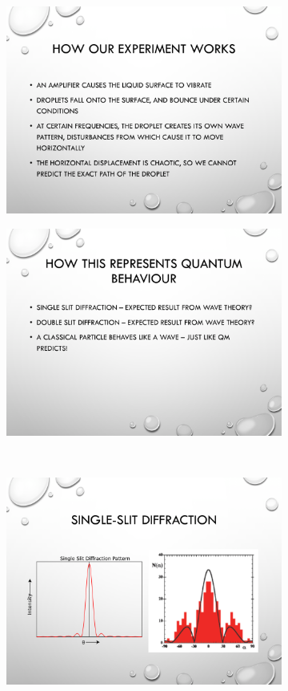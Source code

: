 \begin{figure}
\begin{subfigure}{0.475\textwidth}
\includegraphics[width=\textwidth]{education/ppt/09.png}
\end{subfigure}
\hfill
\begin{subfigure}{0.475\textwidth}
\includegraphics[width=\textwidth]{education/ppt/14.png}
\end{subfigure}
\\
\begin{subfigure}{0.475\textwidth}
\includegraphics[width=\textwidth]{education/ppt/11.png}

\end{subfigure}
\end{figure}
